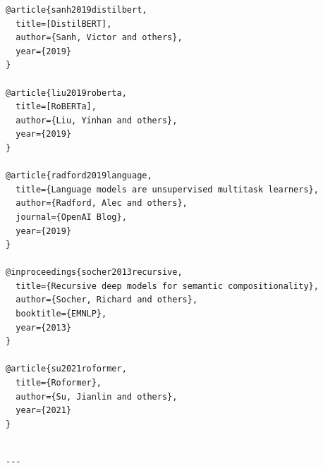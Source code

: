 \begin{lstlisting}
@article{sanh2019distilbert,
  title=[DistilBERT],
  author={Sanh, Victor and others},
  year={2019}
}

@article{liu2019roberta,
  title=[RoBERTa],
  author={Liu, Yinhan and others},
  year={2019}
}

@article{radford2019language,
  title={Language models are unsupervised multitask learners},
  author={Radford, Alec and others},
  journal={OpenAI Blog},
  year={2019}
}

@inproceedings{socher2013recursive,
  title={Recursive deep models for semantic compositionality},
  author={Socher, Richard and others},
  booktitle={EMNLP},
  year={2013}
}

@article{su2021roformer,
  title={Roformer},
  author={Su, Jianlin and others},
  year={2021}
}
\end{lstlisting}
\begin{lstlisting}

---
\end{lstlisting}
